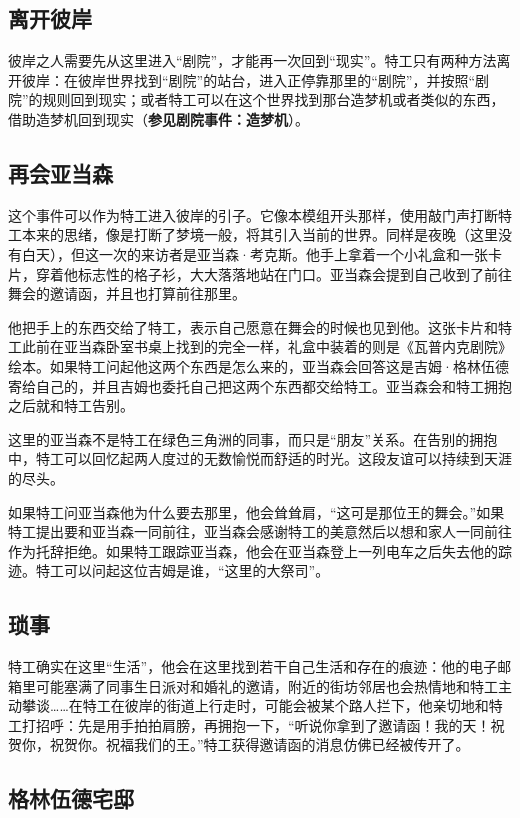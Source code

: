 \subsection{离开彼岸}

彼岸之人需要先从这里进入“剧院”，才能再一次回到“现实”。特工只有两种方法离开彼岸：在彼岸世界找到“剧院”的站台，进入正停靠那里的“剧院”，并按照“剧院”的规则回到现实；或者特工可以在这个世界找到那台造梦机或者类似的东西，借助造梦机回到现实（\textbf{参见剧院事件：造梦机}）。

\subsection{再会亚当森}

这个事件可以作为特工进入彼岸的引子。它像本模组开头那样，使用敲门声打断特工本来的思绪，像是打断了梦境一般，将其引入当前的世界。同样是夜晚（这里没有白天），但这一次的来访者是亚当森·考克斯。他手上拿着一个小礼盒和一张卡片，穿着他标志性的格子衫，大大落落地站在门口。亚当森会提到自己收到了前往舞会的邀请函，并且也打算前往那里。

他把手上的东西交给了特工，表示自己愿意在舞会的时候也见到他。这张卡片和特工此前在亚当森卧室书桌上找到的完全一样，礼盒中装着的则是《瓦普内克剧院》绘本。如果特工问起他这两个东西是怎么来的，亚当森会回答这是吉姆·格林伍德寄给自己的，并且吉姆也委托自己把这两个东西都交给特工。亚当森会和特工拥抱之后就和特工告别。

这里的亚当森不是特工在绿色三角洲的同事，而只是“朋友”关系。在告别的拥抱中，特工可以回忆起两人度过的无数愉悦而舒适的时光。这段友谊可以持续到天涯的尽头。

如果特工问亚当森他为什么要去那里，他会耸耸肩，“这可是那位王的舞会。”如果特工提出要和亚当森一同前往，亚当森会感谢特工的美意然后以想和家人一同前往作为托辞拒绝。如果特工跟踪亚当森，他会在亚当森登上一列电车之后失去他的踪迹。特工可以问起这位吉姆是谁，“这里的大祭司”。

\subsection{琐事}

特工确实在这里“生活”，他会在这里找到若干自己生活和存在的痕迹：他的电子邮箱里可能塞满了同事生日派对和婚礼的邀请，附近的街坊邻居也会热情地和特工主动攀谈……在特工在彼岸的街道上行走时，可能会被某个路人拦下，他亲切地和特工打招呼：先是用手拍拍肩膀，再拥抱一下，“听说你拿到了邀请函！我的天！祝贺你，祝贺你。祝福我们的王。”特工获得邀请函的消息仿佛已经被传开了。

\subsection{格林伍德宅邸}

